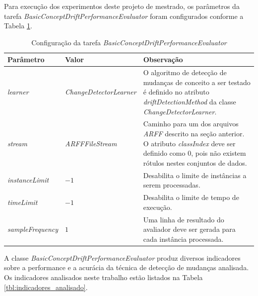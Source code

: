 \documentclass[qual, classic, a4paper]{ufbathesis}
\begin{document}
Para execução dos experimentos deste projeto de mestrado, os parâmetros da tarefa \textit{BasicConceptDriftPerformanceEvaluator} foram configurados conforme a Tabela \ref{tbl:configuracao_tarefa}.

\begin{center} 
    \begin{table}[ht]
    \caption{Configuração da tarefa \textit{BasicConceptDriftPerformanceEvaluator}}
    \label{tbl:configuracao_tarefa}
    \begin{tabular}{llm{7.5cm}}
    \hline
    \textbf{Parâmetro} & \textbf{Valor} & \textbf{Observação} \\
    \hline
    \hline
    \textit{learner}          & \textit{ChangeDetectorLearner}  &  O algoritmo de detecção de mudanças de conceito a ser testado é definido no atributo \textit{driftDetectionMethod} da classe \textit{ChangeDetectorLearner}.                   \\
    \textit{stream}           & \textit{ARFFFileStream}         &  Caminho para um dos arquivos \textit{ARFF} descrito na seção anterior. O atributo \textit{classIndex} deve ser definido como $0$, pois não existem rótulos nestes conjuntos de dados.  \\ 
    \textit{instanceLimit}    & $-1$                            &  Desabilita o limite de instâncias a serem processadas.  \\
    \textit{timeLimit}        & $-1$                            &  Desabilita o limite de tempo de execução.  \\ 
    \textit{sampleFrequency}  & \hspace{3mm}$1$                 &  Uma linha de resultado do avaliador deve ser gerada para cada instância processada.  \\
    \hline
    \end{tabular}
    \end{table}
\end{center}

A classe \textit{BasicConceptDriftPerformanceEvaluator} produz diversos indicadores sobre a performance e a acurácia da técnica de detecção de mudanças analisada.
Os indicadores analisados neste trabalho estão listados na Tabela \ref{tbl:indicadores_analisado}.
\end{document}
